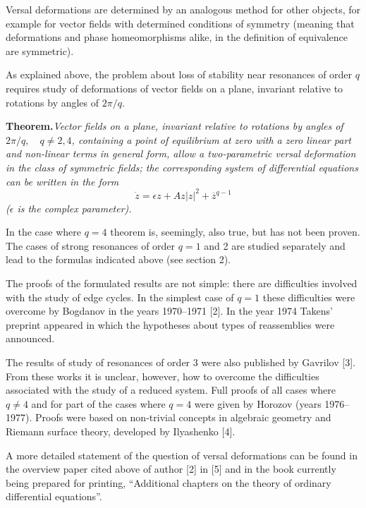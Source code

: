 \documentclass[12pt]{amsart}
\begin{document}
Versal deformations are determined by an analogous method for other objects,
for example for vector fields with determined conditions of symmetry (meaning
that deformations and phase homeomorphisms alike, in the definition of
equivalence are symmetric).

As explained above, the problem about loss of stability near resonances of order
$q$ requires study of deformations of vector fields on a plane, invariant
relative to rotations by angles of $2\pi/q$.

\textbf{Theorem.}\quad\textit{Vector fields on a plane, invariant relative to
rotations by angles of $2\pi/q,\quad q\neq2,4$, containing a point of
equilibrium at zero with a zero linear part and non-linear terms in general
form, allow a two-parametric versal deformation in the class of symmetric
fields; the corresponding system of differential equations can be written in the
form
$$\dot z=\epsilon z+Az|z|^2+\overline z^{q-1}$$
($\epsilon$ is the complex parameter).}

In the case where $q=4$ theorem is, seemingly, also true, but has not been
proven.
The cases of strong resonances of order $q=1$ and 2 are studied separately and
lead to the formulas indicated above (see section 2).

The proofs of the formulated results are not simple: there are difficulties
involved with the study of edge cycles.
In the simplest case of $q=1$ these difficulties were overcome by Bogdanov in
the years 1970--1971 [2].
In the year 1974 Takens' preprint appeared in which the hypotheses about types
of reassemblies were announced.

The results of study of resonances of order 3 were also published by Gavrilov
[3].
From these works it is unclear, however, how to overcome the difficulties
associated with the study of a reduced system.
Full proofs of all cases where $q\neq4$ and for part of the cases where $q=4$
were given by Horozov (years 1976--1977).
Proofs were based on non-trivial concepts in algebraic geometry and Riemann
surface theory, developed by Ilyashenko [4].

A more detailed statement of the question of versal deformations can be found in
the overview paper cited above of author [2] in [5] and in the book currently
being prepared for printing, ``Additional chapters on the theory of ordinary
differential equations''.\\
\end{document}
